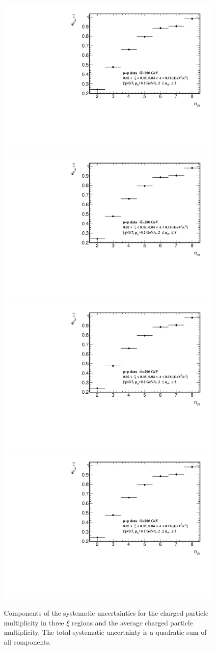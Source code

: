 \begin{figure}[h!]
	\centering
	\includegraphics[width=.47\textwidth,page=6]{chapters/chrgSTAR/img/syst/outSD.pdf}
	\hfill
	\includegraphics[width=.47\textwidth,page=13]{chapters/chrgSTAR/img/syst/outSD.pdf}
	\newline
	\includegraphics[width=.47\textwidth,page=20]{chapters/chrgSTAR/img/syst/outSD.pdf}
	\hfill
	\includegraphics[width=.47\textwidth,page=22]{chapters/chrgSTAR/img/syst/outSD.pdf}
	\caption[Components of the systematic uncertainties for the charged particle multiplicity in three $\xi$ regions and the average charged particle multiplicity]{Components of the systematic uncertainties for the charged particle multiplicity in three $\xi$ regions and the average charged particle multiplicity. The total  systematic uncertainty is a quadratic sum of all  components.}
	\label{fig:results_star_nch_syst}
\end{figure}


